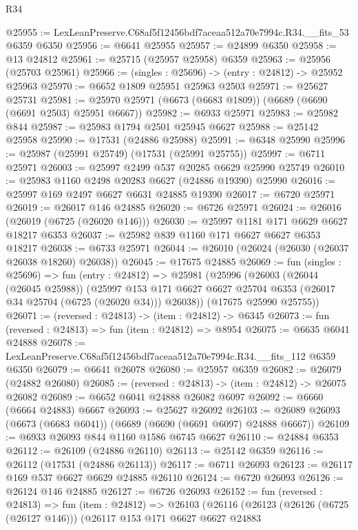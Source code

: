 \begin{lexlean}{R34}
\begin{coremodule}
@25955 := LexLeanPreserve.C68af5f12456bdf7aceaa512a70e7994c.R34.__fits_53 @6359 @6350
@25956 := @6641 @25955
@25957 := @24899 @6350
@25958 := @13 @24812
@25961 := @25715 (@25957 @25958) @6359
@25963 := @25956 (@25703 @25961)
@25966 := (singles : @25696) -> (entry : @24812) -> @25952 @25963
@25970 := @6652 @1809 @25951 @25963 @2503
@25971 := @25627 @25731
@25981 := @25970 @25971 (@6673 (@6683 @1809)) (@6689 (@6690 (@6691 @2503) @25951 @6667))
@25982 := @6933 @25971
@25983 := @25982 @844
@25987 := @25983 @1794 @2501 @25945 @6627
@25988 := @25142 @25958
@25990 := @17531 (@24886 @25988)
@25991 := @6348 @25990
@25996 := @25987 (@25991 @25749) (@17531 (@25991 @25755))
@25997 := @6711 @25971
@26003 := @25997 @2499 @537 @20285 @6629 @25990 @25749
@26010 := @25983 @1160 @2498 @20283 @6627 (@24886 @19390) @25990
@26016 := @25997 @169 @2497 @6627 @6631 @24885 @19390
@26017 := @6720 @25971
@26019 := @26017 @146 @24885
@26020 := @6726 @25971
@26024 := @26016 (@26019 (@6725 (@26020 @146)))
@26030 := @25997 @1181 @171 @6629 @6627 @18217 @6353
@26037 := @25982 @839 @1160 @171 @6627 @6627 @6353 @18217
@26038 := @6733 @25971
@26044 := @26010 (@26024 (@26030 (@26037 @26038 @18260) @26038))
@26045 := @17675 @24885
@26069 := fun (singles : @25696) =>
  fun (entry : @24812) =>
  @25981
    (@25996
      (@26003
        (@26044 (@26045 @25988))
        (@25997 @153 @171 @6627 @6627 @25704 @6353 (@26017 @34 @25704 (@6725 (@26020 @34))) @26038))
      (@17675 @25990 @25755))
@26071 := (reversed : @24813) -> (item : @24812) -> @6345
@26073 := fun (reversed : @24813) => fun (item : @24812) => @8954
@26075 := @6635 @6041 @24888
@26078 := LexLeanPreserve.C68af5f12456bdf7aceaa512a70e7994c.R34.__fits_112 @6359 @6350
@26079 := @6641 @26078
@26080 := @25957 @6359
@26082 := @26079 (@24882 @26080)
@26085 := (reversed : @24813) -> (item : @24812) -> @26075 @26082
@26089 := @6652 @6041 @24888 @26082 @6097
@26092 := @6660 (@6664 @24883) @6667
@26093 := @25627 @26092
@26103 := @26089 @26093 (@6673 (@6683 @6041)) (@6689 (@6690 (@6691 @6097) @24888 @6667))
@26109 := @6933 @26093 @844 @1160 @1586 @6745 @6627
@26110 := @24884 @6353
@26112 := @26109 (@24886 @26110)
@26113 := @25142 @6359
@26116 := @26112 (@17531 (@24886 @26113))
@26117 := @6711 @26093
@26123 := @26117 @169 @537 @6627 @6629 @24885 @26110
@26124 := @6720 @26093
@26126 := @26124 @146 @24885
@26127 := @6726 @26093
@26152 := fun (reversed : @24813) =>
  fun (item : @24812) =>
  @26103
    (@26116
      (@26123
        (@26126 (@6725 (@26127 @146)))
        (@26117
          @153
          @171
          @6627
          @6627
          @24883

\end{coremodule}
\end{lexlean}
